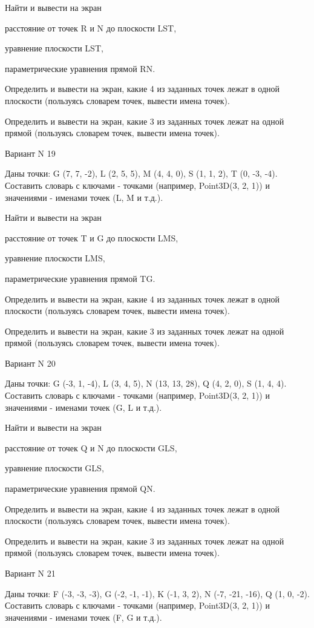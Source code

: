 \documentclass[11pt]{report}
\begin{document}
 
Найти и вывести на экран


расстояние от точек R и N до плоскости LST,

 
уравнение плоскости LST,

 
параметрические уравнения прямой RN.


Определить и вывести на экран, какие 4 из заданных точек лежат в одной плоскости (пользуясь словарем точек, вывести имена точек).


Определить и вывести на экран, какие 3 из заданных точек лежат на одной прямой (пользуясь словарем точек, вывести имена точек).

Вариант N 19

Даны точки: G (7, 7, -2), L (2, 5, 5), M (4, 4, 0), S (1, 1, 2), T (0, -3, -4).
Составить словарь с ключами - точками (например, Point3D(3, 2, 1)) и значениями - именами точек (L, M и т.д.).

 
Найти и вывести на экран


расстояние от точек T и G до плоскости LMS,

 
уравнение плоскости LMS,

 
параметрические уравнения прямой TG.


Определить и вывести на экран, какие 4 из заданных точек лежат в одной плоскости (пользуясь словарем точек, вывести имена точек).


Определить и вывести на экран, какие 3 из заданных точек лежат на одной прямой (пользуясь словарем точек, вывести имена точек).

Вариант N 20

Даны точки: G (-3, 1, -4), L (3, 4, 5), N (13, 13, 28), Q (4, 2, 0), S (1, 4, 4).
Составить словарь с ключами - точками (например, Point3D(3, 2, 1)) и значениями - именами точек (G, L и т.д.).

 
Найти и вывести на экран


расстояние от точек Q и N до плоскости GLS,

 
уравнение плоскости GLS,

 
параметрические уравнения прямой QN.


Определить и вывести на экран, какие 4 из заданных точек лежат в одной плоскости (пользуясь словарем точек, вывести имена точек).


Определить и вывести на экран, какие 3 из заданных точек лежат на одной прямой (пользуясь словарем точек, вывести имена точек).

Вариант N 21

Даны точки: F (-3, -3, -3), G (-2, -1, -1), K (-1, 3, 2), N (-7, -21, -16), Q (1, 0, -2).
Составить словарь с ключами - точками (например, Point3D(3, 2, 1)) и значениями - именами точек (F, G и т.д.).
\end{document}
